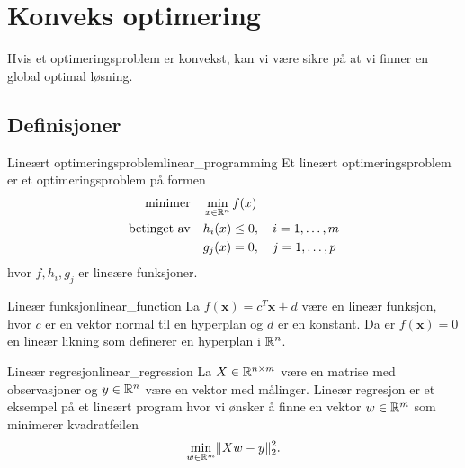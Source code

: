 \chapter{Konveks optimering}

Hvis et optimeringsproblem er konvekst, kan vi være sikre på at vi finner en global optimal løsning.

\section*{Definisjoner}

\begin{definition}{Lineært optimeringsproblem}{linear_programming}
  Et lineært optimeringsproblem er et optimeringsproblem på formen
  \begin{align*}
    \text{minimer}     & \quad \min_{x \in \mathbb{R}^n} f(x)                \\
    \text{betinget av} & \quad h_i(x) \leq 0, \quad i = 1, \ldots, m \\
                       & \quad g_j(x) = 0, \quad j = 1, \ldots, p
  \end{align*}
  hvor \(f, h_i, g_j\) er lineære funksjoner.
\end{definition}

\begin{example}{Lineær funksjon}{linear_function}
  La \(f(\symbf{x}) = c^T\symbf{x} + d\) være en lineær funksjon, hvor \(c\) er en vektor normal til en hyperplan og \(d\) er en konstant.
  Da er \(f(\symbf{x}) = 0\) en lineær likning som definerer en hyperplan i \(\mathbb{R}^n\).
\end{example}

\begin{example}{Lineær regresjon}{linear_regression}
  La \(X \in \mathbb{R}^{n \times m}\) være en matrise med observasjoner og \(y \in \mathbb{R}^n\) være en vektor med målinger.
  Lineær regresjon er et eksempel på et lineært program hvor vi ønsker å finne en vektor \(w \in \mathbb{R}^m\) som minimerer kvadratfeilen
  \begin{equation*}
    \min_{w \in \mathbb{R}^m} \lVert Xw - y\rVert_2^2.
  \end{equation*}
\end{example}
